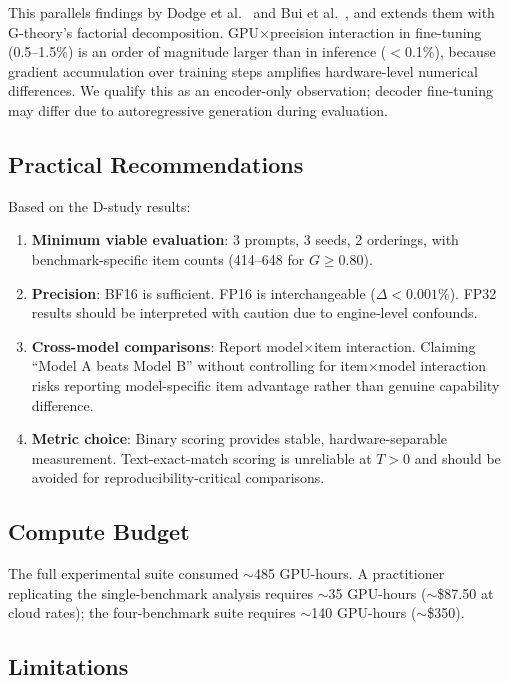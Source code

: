 \documentclass[11pt,a4paper]{article}
\newcommand{\Gcoeff}{\ensuremath{G}}
\begin{document}
This parallels findings by Dodge et al.~\citeyearpar{dodge2020} and Bui et al.~\citeyearpar{bui2025}, and extends them with G-theory's factorial decomposition.
GPU$\times$precision interaction in fine-tuning (0.5--1.5\%) is an order of magnitude larger than in inference ($<$0.1\%), because gradient accumulation over training steps amplifies hardware-level numerical differences.
We qualify this as an encoder-only observation; decoder fine-tuning may differ due to autoregressive generation during evaluation.

\subsection{Practical Recommendations}

Based on the D-study results:
\begin{enumerate}[leftmargin=*,nosep]
\item \textbf{Minimum viable evaluation}: 3 prompts, 3 seeds, 2 orderings, with benchmark-specific item counts (414--648 for $\Gcoeff\geq0.80$).
\item \textbf{Precision}: BF16 is sufficient. FP16 is interchangeable ($\Delta<0.001\%$). FP32 results should be interpreted with caution due to engine-level confounds.
\item \textbf{Cross-model comparisons}: Report model$\times$item interaction. Claiming ``Model A beats Model B'' without controlling for item$\times$model interaction risks reporting model-specific item advantage rather than genuine capability difference.
\item \textbf{Metric choice}: Binary scoring provides stable, hardware-separable measurement. Text-exact-match scoring is unreliable at $T>0$ and should be avoided for reproducibility-critical comparisons.
\end{enumerate}

\subsection{Compute Budget}

The full experimental suite consumed $\sim$485 GPU-hours.
A practitioner replicating the single-benchmark analysis requires $\sim$35 GPU-hours ($\sim$\$87.50 at cloud rates); the four-benchmark suite requires $\sim$140 GPU-hours ($\sim$\$350).

\subsection{Limitations}
\end{document}
